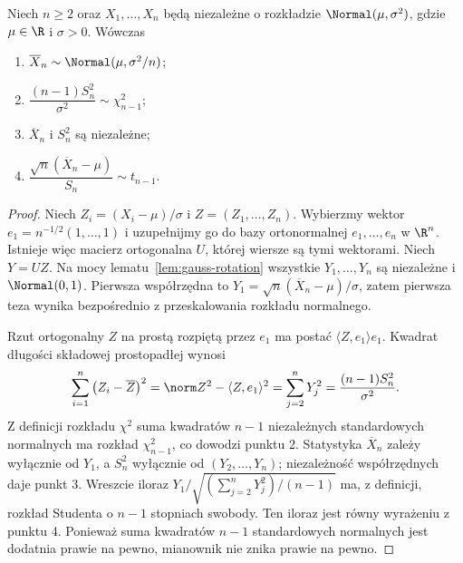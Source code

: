 \begin{twierdzenie}\label{thm:normal-sampling}
Niech $n\ge2$ oraz $X_1,\ldots,X_n$ będą niezależne o rozkładzie $\Normal(\mu,\sigma^2)$, gdzie $\mu\in\R$ i $\sigma>0$. Wówczas
\begin{enumerate}
\item $\overline X_n\sim\Normal(\mu,\sigma^2/n)$;
\item $\dfrac{(n-1)S_n^2}{\sigma^2}\sim\chi^2_{n-1}$;
\item $\overline X_n$ i $S_n^2$ są niezależne;
\item $\dfrac{\sqrt n(\overline X_n-\mu)}{S_n}\sim t_{n-1}$.
\end{enumerate}
\end{twierdzenie}
\begin{proof}
Niech $Z_i=(X_i-\mu)/\sigma$ i $Z=(Z_1,\ldots,Z_n)$. Wybierzmy wektor $e_1=n^{-1/2}(1,\ldots,1)$ i uzupełnijmy go do bazy ortonormalnej $e_1,\ldots,e_n$ w $\R^n$. Istnieje więc macierz ortogonalna $U$, której wiersze są tymi wektorami. Niech $Y=UZ$. Na mocy lematu~\ref{lem:gauss-rotation} wszystkie $Y_1,\ldots,Y_n$ są niezależne i $\Normal(0,1)$. Pierwsza współrzędna to $Y_1=\sqrt n(\overline X_n-\mu)/\sigma$, zatem pierwsza teza wynika bezpośrednio z przeskalowania rozkładu normalnego.

Rzut ortogonalny $Z$ na prostą rozpiętą przez $e_1$ ma postać $\langle Z,e_1\rangle e_1$. Kwadrat długości składowej prostopadłej wynosi
\[
\sum_{i=1}^n\left(Z_i-\overline Z\right)^2
=\norm Z^2-\langle Z,e_1\rangle^2
=\sum_{j=2}^nY_j^2
=\frac{(n-1)S_n^2}{\sigma^2}.
\]
Z definicji rozkładu $\chi^2$ suma kwadratów $n-1$ niezależnych standardowych normalnych ma rozkład $\chi^2_{n-1}$, co dowodzi punktu 2. Statystyka $\overline X_n$ zależy wyłącznie od $Y_1$, a $S_n^2$ wyłącznie od $(Y_2,\ldots,Y_n)$; niezależność współrzędnych daje punkt 3. Wreszcie iloraz $Y_1/\sqrt{(\sum_{j=2}^nY_j^2)/(n-1)}$ ma, z definicji, rozkład Studenta o $n-1$ stopniach swobody. Ten iloraz jest równy wyrażeniu z punktu 4. Ponieważ suma kwadratów $n-1$ standardowych normalnych jest dodatnia prawie na pewno, mianownik nie znika prawie na pewno.
\end{proof}


